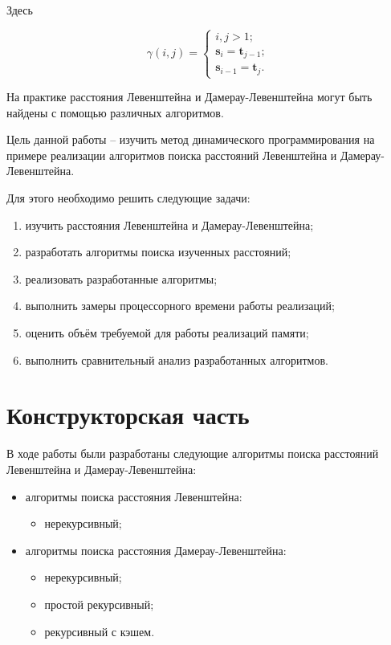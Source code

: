 \documentclass{report}
\begin{document}
Здесь

$$
\gamma(i, j) =
\begin{cases}
    i, j > 1;
    \\
    \textbf{s}_i = \textbf{t}_{j - 1};
    \\
    \textbf{s}_{i - 1} = \textbf{t}_j.
\end{cases}
$$

На практике расстояния Левенштейна и Дамерау-Левенштейна могут
быть найдены с помощью различных алгоритмов.

Цель данной работы -- изучить метод динамического программирования
на примере реализации алгоритмов поиска расстояний Левенштейна и
Дамерау-Левенштейна.

Для этого необходимо решить следующие задачи:

\begin{enumerate}
    \item изучить расстояния Левенштейна и Дамерау-Левенштейна;
    \item разработать алгоритмы поиска изученных расстояний;
    \item реализовать разработанные алгоритмы;
    \item выполнить замеры процессорного времени работы реализаций;
    \item оценить объём требуемой для работы реализаций памяти;
    \item выполнить сравнительный анализ разработанных алгоритмов.
\end{enumerate}

\chapter{Конструкторская часть}

В ходе работы были разработаны следующие алгоритмы поиска
расстояний Левенштейна и Дамерау-Левенштейна:

\begin{itemize}
    \item алгоритмы поиска расстояния Левенштейна:
    \begin{itemize}
        \item нерекурсивный;
    \end{itemize}
    \item алгоритмы поиска расстояния Дамерау-Левенштейна:
    \begin{itemize}
        \item нерекурсивный;
        \item простой рекурсивный;
        \item рекурсивный с кэшем.
    \end{itemize}
\end{itemize}
\end{document}
